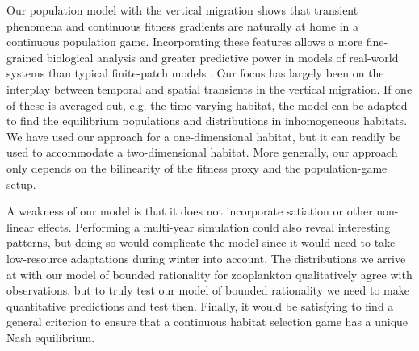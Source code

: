 




Our population model with the vertical migration shows that transient phenomena and continuous fitness gradients \citep{kawecki2004conceptual} are naturally at home in a continuous population game. Incorporating these features allows a more fine-grained biological analysis and greater predictive power in models of real-world systems than typical finite-patch models \citep{kvrivan2008ideal, sadowski2019predator}. Our focus has largely been on the interplay between temporal and spatial transients in the vertical migration. If one of these is averaged out, e.g. the time-varying habitat, the model can be adapted to find the equilibrium populations and distributions in inhomogeneous habitats. We have used our approach for a one-dimensional habitat, but it can readily be used to accommodate a two-dimensional habitat. More generally, our approach only depends on the bilinearity of the fitness proxy and the population-game setup.



A weakness of our model is that it does not incorporate satiation or other non-linear effects. Performing a multi-year simulation could also reveal interesting patterns, but doing so would complicate the model since it would need to take low-resource adaptations during winter into account. The distributions we arrive at with our model of bounded rationality for zooplankton qualitatively agree with observations, but to truly test our model of bounded rationality we need to make quantitative predictions and test then. Finally, it would be satisfying to find a general criterion to ensure that a continuous habitat selection game has a unique Nash equilibrium.


